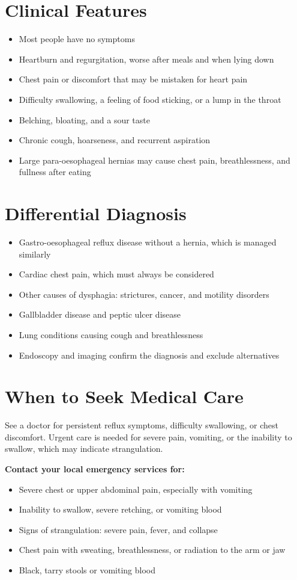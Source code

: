 \section*{Clinical Features}
\begin{itemize}
    \item Most people have no symptoms
    \item Heartburn and regurgitation, worse after meals and when lying down
    \item Chest pain or discomfort that may be mistaken for heart pain
    \item Difficulty swallowing, a feeling of food sticking, or a lump in the throat
    \item Belching, bloating, and a sour taste
    \item Chronic cough, hoarseness, and recurrent aspiration
    \item Large para-oesophageal hernias may cause chest pain, breathlessness, and fullness after eating
\end{itemize}

\section*{Differential Diagnosis}
\begin{itemize}
    \item Gastro-oesophageal reflux disease without a hernia, which is managed similarly
    \item Cardiac chest pain, which must always be considered
    \item Other causes of dysphagia: strictures, cancer, and motility disorders
    \item Gallbladder disease and peptic ulcer disease
    \item Lung conditions causing cough and breathlessness
    \item Endoscopy and imaging confirm the diagnosis and exclude alternatives
\end{itemize}

\section*{When to Seek Medical Care}
See a doctor for persistent reflux symptoms, difficulty swallowing, or chest discomfort. Urgent care is needed for severe pain, vomiting, or the inability to swallow, which may indicate strangulation.

\textbf{Contact your local emergency services for:}
\begin{itemize}
    \item Severe chest or upper abdominal pain, especially with vomiting
    \item Inability to swallow, severe retching, or vomiting blood
    \item Signs of strangulation: severe pain, fever, and collapse
    \item Chest pain with sweating, breathlessness, or radiation to the arm or jaw
    \item Black, tarry stools or vomiting blood
\end{itemize}

